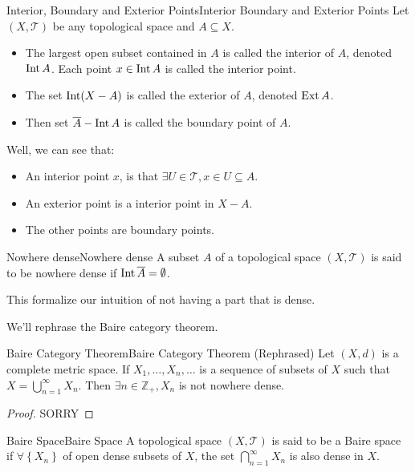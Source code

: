 \documentclass[../main.tex]{subfiles}
\begin{document}
\begin{definition}{Interior, Boundary and Exterior Points}{Interior Boundary and Exterior Points}
Let $(X,\mathcal{T})$ be any topological space and $A \subseteq X$.
\begin{itemize}
\item The largest open subset contained in $A$ is called the interior of $A$, denoted $\operatorname{Int} A$. Each point $x\in \operatorname{Int} A$ is called the interior point. 
\item The set $\operatorname{Int} (X-A)$ is called the exterior of $A$, denoted $\operatorname{Ext} A$.
\item Then set $\overline{A}-\operatorname{Int} A$ is called the boundary point of $A$.
\end{itemize}
\end{definition}
\begin{remark}
Well, we can see that:
\begin{itemize}
\item An interior point $x$, is that $\exists U\in \mathcal{T}, x\in U \subseteq A$.
\item An exterior point is a interior point in  $X-A$.
\item The other points are boundary points.
\end{itemize}
\end{remark}

\begin{definition}{Nowhere dense}{Nowhere dense}
A subset $A$ of a topological space $(X,\mathcal{T})$ is said to be nowhere dense if $\operatorname{Int} \overline{A} = \emptyset $.
\end{definition}

This formalize our intuition of not having a part that is dense.

We'll rephrase the Baire category theorem.
\begin{corollary}{Baire Category Theorem}{Baire Category Theorem (Rephrased)}
Let $(X,d)$ is a complete metric space. If $X_1, \ldots ,X_n, \ldots $ is a sequence of subsets of $X$ such that $X = \bigcup_{n=1}^{\infty } X_n$. Then $\exists n\in \mathbb{Z}_+, X_n$ is not nowhere dense.
\end{corollary}
\begin{proof}
SORRY
\end{proof}

\begin{definition}{Baire Space}{Baire Space}
A topological space $(X,\mathcal{T})$ is said to be a Baire space if $\forall \left\{ X_n \right\}$ of open dense subsets of $X$, the set $\bigcap_{n=1}^{\infty } X_n$ is also dense in $X$.
\end{definition}
\end{document}
